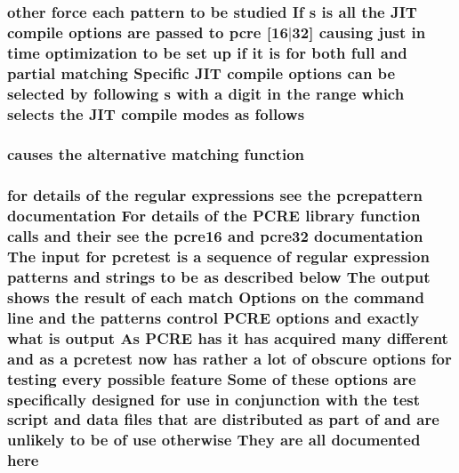 \subsubsection[{\texorpdfstring{follows}{follows}}]{ other force each {\bf pattern} {\bf to} {\bf be} {\bf studied} If {\bf s} {\bf is} {\bf all} the J\+IT {\bf compile} {\bf options} {\bf are} passed {\bf to} {\bf pcre} \mbox{[}16$\vert$32\mbox{]} causing just {\bf in} {\bf time} optimization {\bf to} {\bf be} {\bf set} up {\bf if} {\bf it} {\bf is} for both full and {\bf partial} {\bf matching} Specific J\+IT {\bf compile} {\bf options} {\bf can} {\bf be} {\bf selected} by following {\bf s} {\bf with} {\bf a} digit {\bf in} the range {\bf which} selects the J\+IT {\bf compile} {\bf modes} {\bf as} follows}\hypertarget{pcretest_8txt_ac067b4eb1a245e072fab79190811f873}{}\label{pcretest_8txt_ac067b4eb1a245e072fab79190811f873}
\subsubsection[{\texorpdfstring{function}{function}}]{ causes the alternative {\bf matching} function}\hypertarget{pcretest_8txt_abd306f12a46ac3f6be69579bceb817d0}{}\label{pcretest_8txt_abd306f12a46ac3f6be69579bceb817d0}
\subsubsection[{\texorpdfstring{here}{here}}]{\setlength{\rightskip}{0pt plus 5cm}for {\bf details} {\bf of} the regular {\bf expressions} see the {\bf pcrepattern} {\bf documentation} For {\bf details} {\bf of} the {\bf P\+C\+RE} {\bf library} {\bf function} {\bf calls} and their see the {\bf pcre16} and {\bf pcre32} {\bf documentation} The {\bf input} for {\bf pcretest} {\bf is} {\bf a} {\bf sequence} {\bf of} regular {\bf expression} {\bf patterns} and {\bf strings} {\bf to} {\bf be} {\bf as} described {\bf below} The {\bf output} shows the {\bf result} {\bf of} each {\bf match} Options {\bf on} the {\bf command} {\bf line} and the {\bf patterns} control {\bf P\+C\+RE} {\bf options} and {\bf exactly} {\bf what} {\bf is} {\bf output} As {\bf P\+C\+RE} has {\bf it} has acquired many different and {\bf as} {\bf a} {\bf pcretest} {\bf now} has rather {\bf a} lot {\bf of} obscure {\bf options} for testing every {\bf possible} {\bf feature} Some {\bf of} these {\bf options} {\bf are} specifically designed for use {\bf in} conjunction {\bf with} the test {\bf script} and {\bf data} {\bf files} that {\bf are} {\bf distributed} {\bf as} part {\bf of} and {\bf are} unlikely {\bf to} {\bf be} {\bf of} use otherwise They {\bf are} {\bf all} documented here}\hypertarget{pcretest_8txt_a39faba164c272dda4478c61107b7bb07}{}\label{pcretest_8txt_a39faba164c272dda4478c61107b7bb07}
